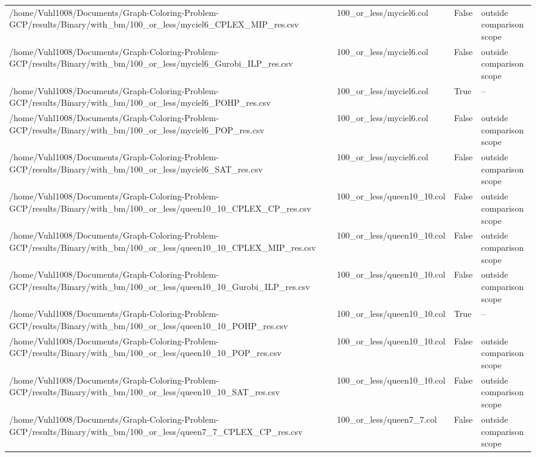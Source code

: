 \begin{table}[htbp]
\begin{tabular}{llll}
/home/Vuhl1008/Documents/Graph-Coloring-Problem-GCP/results/Binary/with\_bm/100\_or\_less/myciel6\_CPLEX\_MIP\_res.csv & 100\_or\_less/myciel6.col & False & outside comparison scope \\
/home/Vuhl1008/Documents/Graph-Coloring-Problem-GCP/results/Binary/with\_bm/100\_or\_less/myciel6\_Gurobi\_ILP\_res.csv & 100\_or\_less/myciel6.col & False & outside comparison scope \\
/home/Vuhl1008/Documents/Graph-Coloring-Problem-GCP/results/Binary/with\_bm/100\_or\_less/myciel6\_POHP\_res.csv & 100\_or\_less/myciel6.col & True & -- \\
/home/Vuhl1008/Documents/Graph-Coloring-Problem-GCP/results/Binary/with\_bm/100\_or\_less/myciel6\_POP\_res.csv & 100\_or\_less/myciel6.col & False & outside comparison scope \\
/home/Vuhl1008/Documents/Graph-Coloring-Problem-GCP/results/Binary/with\_bm/100\_or\_less/myciel6\_SAT\_res.csv & 100\_or\_less/myciel6.col & False & outside comparison scope \\
/home/Vuhl1008/Documents/Graph-Coloring-Problem-GCP/results/Binary/with\_bm/100\_or\_less/queen10\_10\_CPLEX\_CP\_res.csv & 100\_or\_less/queen10\_10.col & False & outside comparison scope \\
/home/Vuhl1008/Documents/Graph-Coloring-Problem-GCP/results/Binary/with\_bm/100\_or\_less/queen10\_10\_CPLEX\_MIP\_res.csv & 100\_or\_less/queen10\_10.col & False & outside comparison scope \\
/home/Vuhl1008/Documents/Graph-Coloring-Problem-GCP/results/Binary/with\_bm/100\_or\_less/queen10\_10\_Gurobi\_ILP\_res.csv & 100\_or\_less/queen10\_10.col & False & outside comparison scope \\
/home/Vuhl1008/Documents/Graph-Coloring-Problem-GCP/results/Binary/with\_bm/100\_or\_less/queen10\_10\_POHP\_res.csv & 100\_or\_less/queen10\_10.col & True & -- \\
/home/Vuhl1008/Documents/Graph-Coloring-Problem-GCP/results/Binary/with\_bm/100\_or\_less/queen10\_10\_POP\_res.csv & 100\_or\_less/queen10\_10.col & False & outside comparison scope \\
/home/Vuhl1008/Documents/Graph-Coloring-Problem-GCP/results/Binary/with\_bm/100\_or\_less/queen10\_10\_SAT\_res.csv & 100\_or\_less/queen10\_10.col & False & outside comparison scope \\
/home/Vuhl1008/Documents/Graph-Coloring-Problem-GCP/results/Binary/with\_bm/100\_or\_less/queen7\_7\_CPLEX\_CP\_res.csv & 100\_or\_less/queen7\_7.col & False & outside comparison scope \\

\end{tabular}
\end{table}
